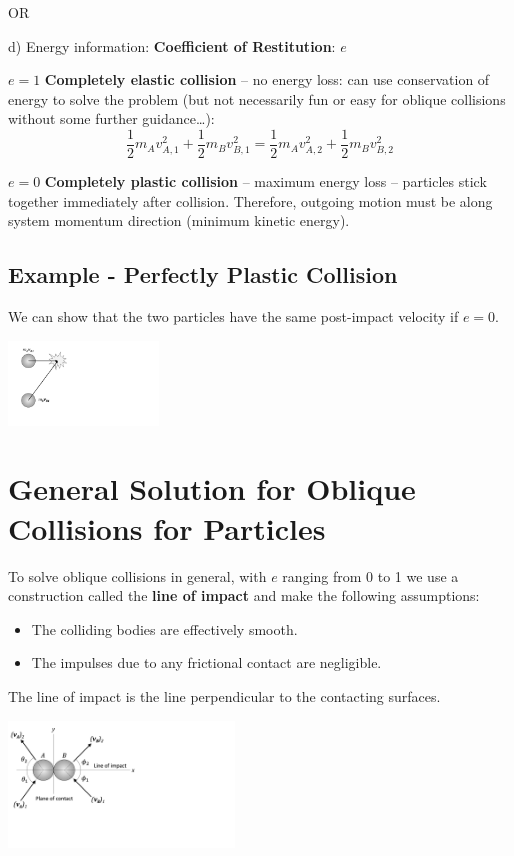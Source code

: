 \documentclass[12pt,letterpaper,twoside]{report}
\begin{document}
OR

d)	Energy information:  \textbf{Coefficient of Restitution}:  $e$

$e=1$	\textbf{Completely elastic collision} – no energy loss:  can use conservation of energy to solve the problem (but not necessarily fun or easy for oblique collisions without some further guidance…):
\[ \frac{1}{2} m_A v_{A,1}^2 + \frac{1}{2} m_B v_{B,1}^2 = \frac{1}{2} m_A v_{A,2}^2 + \frac{1}{2} m_B v_{B,2}^2 \]

$e=0$	\textbf{Completely plastic collision} – maximum energy loss – particles stick together immediately after collision.  Therefore, outgoing motion must be along system momentum direction (minimum kinetic energy).  

\newpage

\subsection{Example - Perfectly Plastic Collision}
We can show that the two particles have the same post-impact velocity if $e = 0$. 

\includegraphics[trim={2cm 0cm 20cm 0cm},clip,width=0.3\textwidth, left]{Slide105}

\newpage

\section{General Solution for Oblique Collisions for Particles}
To solve oblique collisions in general, with $e$ ranging from 0 to 1 we use a construction called the \textbf{line of impact} and make the following assumptions:
\begin{itemize}
\item The colliding bodies are effectively smooth.
\item The impulses due to any frictional contact are negligible. 
\end{itemize}

The line of impact is the line perpendicular to the contacting surfaces.  

\includegraphics[trim={0cm 5cm 15cm 0cm},clip,width=0.45\textwidth, center]{Slide106}
\end{document}
